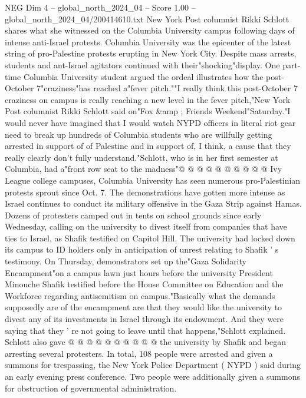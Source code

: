 \begin{textsample}{NEG Dim 4 – global\_north\_2024\_04 – Score 1.00 – global\_north\_2024\_04/200414610.txt}  \label{ex:f4_neg_096}
New York Post columnist Rikki Schlott shares what she witnessed on the Columbia University campus following days of intense anti-Israel protests.
Columbia University was the epicenter of the latest string of pro-Palestine protests erupting in New York City.
Despite mass arrests, students and ant-Israel agitators continued with their"shocking"display.
One part-time Columbia University student argued the ordeal illustrates how the post-October 7"craziness"has reached a"fever pitch.""I really think this post-October 7 craziness on campus is really reaching a new level in the fever pitch,"New York Post columnist Rikki Schlott said on"Fox \&amp ; Friends Weekend"Saturday."I would never have imagined that I would watch NYPD officers in literal riot gear need to break up hundreds of Columbia students who are willfully getting arrested in support of of Palestine and in support of, I think, a cause that they really clearly don't fully understand."Schlott, who is in her first semester at Columbia, had a"front row seat to the madness"@ @ @ @ @ @ @ @ @ @ Ivy League college campuses, Columbia University has seen numerous pro-Palestinian protests sprout since Oct. 7.
The demonstrations have gotten more intense as Israel continues to conduct its military offensive in the Gaza Strip against Hamas.
Dozens of protesters camped out in tents on school grounds since early Wednesday, calling on the university to divest itself from companies that have ties to Israel, as Shafik testified on Capitol Hill.
The university had locked down its campus to ID holders only in anticipation of unrest relating to Shafik ' s testimony.
On Thursday, demonstrators set up the"Gaza Solidarity Encampment"on a campus lawn just hours before the university President Minouche Shafik testified before the House Committee on Education and the Workforce regarding antisemitism on campus."Basically what the demands supposedly are of the encampment are that they would like the university to divest any of its investments in Israel through its endowment.
And they were saying that they ' re not going to leave until that happens,"Schlott explained.
Schlott also gave @ @ @ @ @ @ @ @ @ @ the university by Shafik and began arresting several protesters.
In total, 108 people were arrested and given a summons for trespassing, the New York Police Department ( NYPD ) said during an early evening press conference.
Two people were additionally given a summons for obstruction of governmental administration.

\end{textsample}

